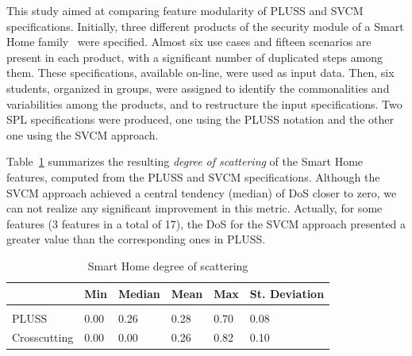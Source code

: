 \documentclass{acm_proc_article-sp}
\begin{document}
This study aimed at comparing feature modularity of PLUSS and SVCM
specifications. Initially, three different products of the security module of a
Smart Home family~\cite{Pohl:2005aa} were specified. Almost six use cases and
fifteen scenarios are present in each product, with a significant number of
duplicated steps among them. These specifications, available on-line, were used
as input data. Then, six students, organized in groups, were assigned to identify
the commonalities and variabilities among the products, and to restructure the
input specifications. Two SPL specifications were produced, one using the PLUSS
notation and the other one using the SVCM approach.





Table~\ref{tab:sh-dos} summarizes the resulting \emph{degree of scattering} of
the Smart Home features, computed from the PLUSS and SVCM specifications. Although the
SVCM approach achieved a central tendency (median) of DoS closer to
zero, we can not realize any significant improvement in this metric. Actually, for some
features (3 features in a total of 17), the DoS for the SVCM approach presented a greater value than the corresponding ones in PLUSS.

\begin{table}[htb]
\centering
\caption{Smart Home degree of scattering}
\label{tab:sh-dos}
\begin{small}
\begin{tabular}{llllll} \hline
					& Min 	& Median 	& Mean 	& Max 	& St. Deviation \\ \hline \\
	PLUSS			& 0.00  & 0.26   	& 0.28  & 0.70 	& 0.08 			\\
	Crosscutting	& 0.00  & 0.00  	& 0.26 	& 0.82 & 0.10  		\\ \hline	
\end{tabular}
\end{small}
\end{table}
\end{document}
